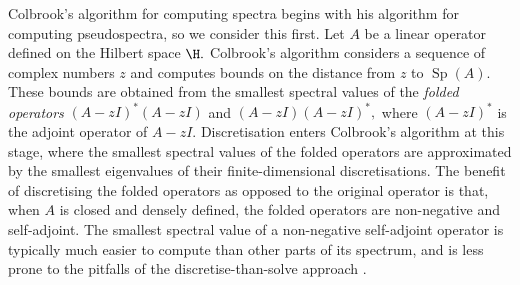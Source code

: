 


 Colbrook's algorithm for computing spectra begins with his algorithm for computing pseudospectra, so we consider this first. Let $A$ be a linear operator defined on the Hilbert space $\H.$ Colbrook's algorithm considers a sequence of complex numbers $z$ and computes bounds on the distance from $z$ to $\operatorname{Sp}(A).$ These bounds are obtained from the smallest spectral values of the \textit{folded operators} $(A-zI)^*(A-zI)$ and $(A-zI)(A-zI)^*,$ where $(A-zI)^*$ is the adjoint operator of $A-zI.$ 
 Discretisation enters Colbrook's algorithm at this stage, where the smallest spectral values of the folded operators are approximated by the smallest eigenvalues of their finite-dimensional discretisations. The benefit of discretising the folded operators as opposed to the original operator is that, when $A$ is closed and densely defined, the folded operators are non-negative and self-adjoint.
The smallest spectral value of a non-negative self-adjoint operator is typically much easier to compute than other parts of its spectrum, and is less prone to the pitfalls of the discretise-than-solve approach \cite{Matt}. 


